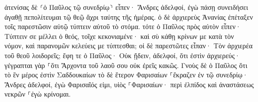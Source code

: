 \documentclass{openreader}
\begin{document}
ἀτενίσας δὲ ⸂ὁ Παῦλος τῷ συνεδρίῳ⸃ εἶπεν· Ἄνδρες ἀδελφοί, ἐγὼ πάσῃ συνειδήσει ἀγαθῇ πεπολίτευμαι τῷ θεῷ ἄχρι ταύτης τῆς ἡμέρας. 
ὁ δὲ ἀρχιερεὺς Ἁνανίας ἐπέταξεν τοῖς παρεστῶσιν αὐτῷ τύπτειν αὐτοῦ τὸ στόμα. 
τότε ὁ Παῦλος πρὸς αὐτὸν εἶπεν· Τύπτειν σε μέλλει ὁ θεός, τοῖχε κεκονιαμένε· καὶ σὺ κάθῃ κρίνων με κατὰ τὸν νόμον, καὶ παρανομῶν κελεύεις με τύπτεσθαι; 
οἱ δὲ παρεστῶτες εἶπαν· Τὸν ἀρχιερέα τοῦ θεοῦ λοιδορεῖς; 
ἔφη τε ὁ Παῦλος· Οὐκ ᾔδειν, ἀδελφοί, ὅτι ἐστὶν ἀρχιερεύς· γέγραπται γὰρ ⸀ὅτι Ἄρχοντα τοῦ λαοῦ σου οὐκ ἐρεῖς κακῶς. 
Γνοὺς δὲ ὁ Παῦλος ὅτι τὸ ἓν μέρος ἐστὶν Σαδδουκαίων τὸ δὲ ἕτερον Φαρισαίων ⸀ἔκραζεν ἐν τῷ συνεδρίῳ· Ἄνδρες ἀδελφοί, ἐγὼ Φαρισαῖός εἰμι, υἱὸς ⸀Φαρισαίων· περὶ ἐλπίδος καὶ ἀναστάσεως νεκρῶν ⸀ἐγὼ κρίνομαι. 
\end{document}
